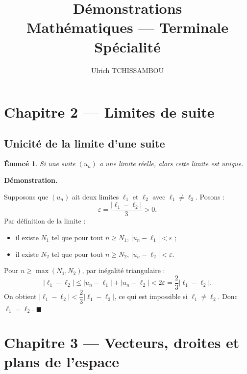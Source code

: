 \documentclass[11pt,a4paper]{article}
\author{Ulrich TCHISSAMBOU}
\title{\textbf{Démonstrations}\\[4pt]
       \large Mathématiques --- Terminale Spécialité}
\date{}
\theoremstyle{enoncestyle}
\newtheorem{enonce}{Énoncé}[section]
\renewenvironment{proof}[1][\proofname]{%
  \par\medskip
  \noindent\textbf{\color{black!70}#1.}\quad\itshape
}{%
  \hfill$\blacksquare$\par\medskip
}
\begin{document}
\maketitle
\tableofcontents
\newpage

\section{Chapitre 2 — Limites de suite}

\subsection{Unicité de la limite d'une suite}

\begin{mdframed}[linecolor=blue!40,backgroundcolor=blue!4,linewidth=1pt]
\begin{enonce}
Si une suite $(u_n)$ a une limite réelle, alors cette limite est unique.
\end{enonce}
\end{mdframed}

\begin{proof}[Démonstration]
Supposons que $(u_n)$ ait deux limites $\ell_1$ et $\ell_2$ avec $\ell_1 \neq \ell_2$.
Posons :
\[
    \varepsilon = \frac{|\ell_1 - \ell_2|}{3} > 0.
\]
Par définition de la limite :
\begin{itemize}
    \item il existe $N_1$ tel que pour tout $n \geq N_1$, $|u_n - \ell_1| < \varepsilon$ ;
    \item il existe $N_2$ tel que pour tout $n \geq N_2$, $|u_n - \ell_2| < \varepsilon$.
\end{itemize}
Pour $n \geq \max(N_1, N_2)$, par inégalité triangulaire :
\[
    |\ell_1 - \ell_2| \leq |u_n - \ell_1| + |u_n - \ell_2|
    < 2\varepsilon = \frac{2}{3}|\ell_1 - \ell_2|.
\]
On obtient $|\ell_1 - \ell_2| < \dfrac{2}{3}|\ell_1 - \ell_2|$, ce qui est impossible
si $\ell_1 \neq \ell_2$. Donc $\ell_1 = \ell_2$.
\end{proof}

\section{Chapitre 3 — Vecteurs, droites et plans de l'espace}
\end{document}
